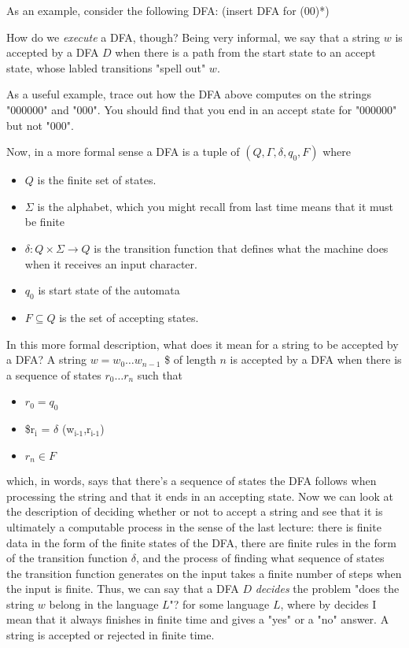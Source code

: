 \documentclass[11pt]{article}
\begin{document}
As an example, consider the following DFA: (insert DFA for (00)*)

How do we \emph{execute} a DFA, though? Being very informal, we say that a string $w$ is accepted by a DFA $D$ when there is a path from the start state to an accept state, whose labled transitions "spell out" $w$.

As a useful example, trace out how the DFA above computes on the strings "000000" and "000". You should find that you end in an accept state for "000000" but not "000". 

Now, in a more formal sense a DFA is a tuple of $(Q,\Gamma,\delta,q_0,F)$ where 
\begin{itemize}
\item $Q$ is the finite set of states.
\item $\Sigma$ is the alphabet, which you might recall from last time means that it must be finite
\item $\delta : Q \times \Sigma \to Q$ is the transition function that defines what the machine does when it receives an input character.
\item $q_0$ is start state of the automata
\item $F \subseteq Q$ is the set of accepting states.
\end{itemize}

In this more formal description, what does it mean for a string to be accepted by a DFA? A string $w = w_0 \ldots w_{n-1}$ \$ of length $n$ is accepted by a DFA when there is a sequence of states $r_0 \ldots r_n$ such that 
\begin{itemize}
\item $r_0 = q_0$
\item \$r$_{\text{i}}$ = $\delta$ (w$_{\text{i-1}}$,r$_{\text{i-1}}$)
\item $r_n \in F$
\end{itemize}
which, in words, says that there's a sequence of states the DFA follows when processing the string and that it ends in an accepting state. Now we can look at the description of deciding whether or not to accept a string and see that it is ultimately a computable process in the sense of the last lecture: there is finite data in the form of the finite states of the DFA, there are finite rules in the form of the transition function $\delta$, and the process of finding what sequence of states the transition function generates on the input takes a finite number of steps when the input is finite. Thus, we can say that a DFA $D$ \emph{decides} the problem "does the string $w$ belong in the language $L$"? for some language $L$, where by decides I mean that it always finishes in finite time and gives a "yes" or a "no" answer. A string is accepted or rejected in finite time.
\end{document}
